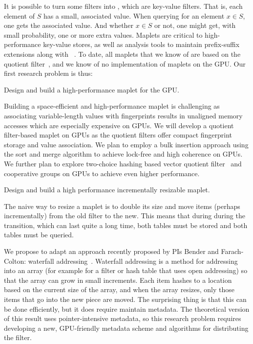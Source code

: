 
It is possible to turn some filters into , which are key-value filters.  That is, each element of $S$ has a small, associated value.  When querying for an element $x\in S$, one gets the associated value.  And whether $x\in S$ or not, one might get, with small probability, one or more extra values.  Maplets are critical to high-performance key-value stores, as well as \kmer analysis tools to maintain prefix-suffix extensions along with \kmers~\cite{GeorganasEHG18}.  To date, all maplets that we know of are based on the quotient filter~\cite{conway2020splinterdb,PandeyBJP17}, and we know of no implementation of maplets on the GPU\@.
%
Our first research problem is thus:

\begin{rproblem}
Design and build a high-performance maplet for the GPU\@.
\end{rproblem}

Building a space-efficient and high-performance maplet is challenging as associating variable-length values with fingerprints results in unaligned memory accesses which are especially expensive on GPUs. We will develop a quotient filter-based maplet on GPUs as the quotient filters offer compact fingerprint storage and value association. We plan to employ a bulk insertion approach using the sort and merge algorithm to achieve lock-free and high coherence on GPUs. We further plan to explore two-choice hashing based vector quotient filter~\cite{PandeyCDBFJ21} and cooperative groups on GPUs to achieve even higher performance.

\begin{rproblem}\label{rprob:resizable-maplet}
Design and build a high performance incrementally resizable maplet.
\end{rproblem}
The naive way to resize a maplet is to double its size and move items (perhaps incrementally) from the old filter to the new.  This means that during during the transition, which can last quite a long time, both tables must be stored and both tables must be queried.

We propose to adapt an approach recently proposed by PIs Bender and Farach-Colton: waterfall addressing~\cite{Bender2022}.   Waterfall addressing is a method for addressing into an array (for example for a filter or hash table that uses open addressing) so that the array can grow in small increments.  Each item hashes to a location based on the current size of the array, and when the array resizes, only those items that go into the new piece are moved.  The surprising thing is that this can be done efficiently, but it does require maintain metadata.  The theoretical version of this result uses pointer-intensive metadata, so this research problem requires developing a new, GPU-friendly metadata scheme and algorithms for distributing the filter.

